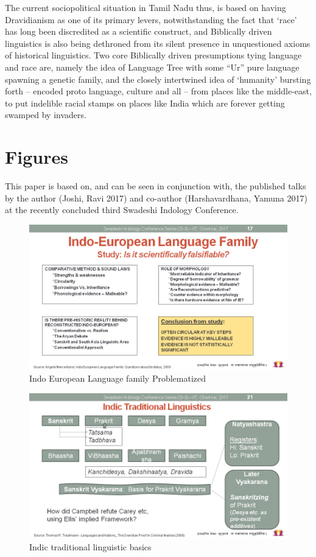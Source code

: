 The current sociopolitical situation in Tamil Nadu thus, is based on having Dravidianism as one of its primary levers, notwithstanding the fact that ‘race’ has long been discredited as a scientific construct, and Biblically driven linguistics is also being dethroned from its silent presence in unquestioned axioms of historical linguistics. Two core Biblically driven presumptions tying language and race are, namely the idea of Language Tree with some “Ur” pure language spawning a genetic family, and the closely intertwined idea of ‘humanity’ bursting forth – encoded proto language, culture and all – from places like the middle-east, to put indelible racial stamps on places like India which are forever getting swamped by invaders.


\section*{Figures}

\vskip -7pt

This paper is based on, and can be seen in conjunction with, the published talks by the author (Joshi, Ravi 2017) and co-author (Harshavardhana, Yamuna 2017) at the recently concluded third Swadeshi Indology Conference.

\begin{figure}
\includegraphics[scale=0.29]{"images/article-02/art02-fig01.jpg"}
\caption{Indo European Language family Problematized}\label{art2-fig01}
\end{figure}


\begin{figure}
\includegraphics[scale=0.29]{"images/article-02/art02-fig02.jpg"}
\caption{Indic traditional linguistic basics}\label{art2-fig02}
\end{figure}


